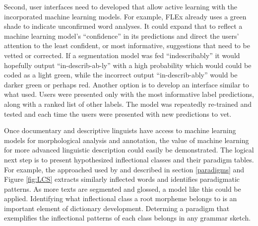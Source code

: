 \documentclass[12pt]{article}
\begin{document}
Second, user interfaces need to developed that allow active learning with the incorporated machine learning models. For example, FLEx already uses a green shade to indicate unconfirmed word analyses. It could expand that to reflect a machine learning model's ``confidence'' in its predictions and direct the users' attention to the least confident, or most informative, suggestions that need to be vetted or corrected. If a segmentation model was fed ``indescribably'' it would hopefully output ``in-describ-ab-ly'' with a high probability which would could be coded as a light green, while the incorrect output ``in-describ-ably'' would be darker green or perhaps red. Another option is to develop an interface similar to what  used. Users were presented only with the most informative label predictions, along with a ranked list of other labels. The model was repeatedly re-trained and tested and each time the users were presented with new predictions to vet.

Once documentary and descriptive linguists have access to machine learning models for morphological analysis and annotation, the value of machine learning for more advanced linguistic description could easily be demonstrated. The logical next step is to present hypothesized inflectional classes and their paradigm tables.  For example, the approached used by  and described in section \ref{paradigms} and Figure \ref{fig:LCS} extracts similarly inflected words and identifies paradigmatic patterns. As more texts are segmented and glossed, a model like this could be applied. Identifying what inflectional class a root morpheme belongs to is an important element of dictionary development. Determing a paradigm that exemplifies the inflectional patterns of each class belongs in any grammar sketch.
\end{document}
